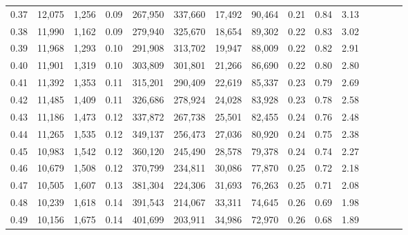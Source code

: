 \begin{tabular}{rrrcrrrrrrrrrrr}
0.37 &  12,075 &  1,256 &                                       0.09 &  267,950 &  337,660 &   17,492 &   90,464 &  0.21 &  0.84 &                         3.13 \\
0.38 &  11,990 &  1,162 &                                       0.09 &  279,940 &  325,670 &   18,654 &   89,302 &  0.22 &  0.83 &                         3.02 \\
0.39 &  11,968 &  1,293 &                                       0.10 &  291,908 &  313,702 &   19,947 &   88,009 &  0.22 &  0.82 &                         2.91 \\
0.40 &  11,901 &  1,319 &                                       0.10 &  303,809 &  301,801 &   21,266 &   86,690 &  0.22 &  0.80 &                         2.80 \\
0.41 &  11,392 &  1,353 &                                       0.11 &  315,201 &  290,409 &   22,619 &   85,337 &  0.23 &  0.79 &                         2.69 \\
0.42 &  11,485 &  1,409 &                                       0.11 &  326,686 &  278,924 &   24,028 &   83,928 &  0.23 &  0.78 &                         2.58 \\
0.43 &  11,186 &  1,473 &                                       0.12 &  337,872 &  267,738 &   25,501 &   82,455 &  0.24 &  0.76 &                         2.48 \\
0.44 &  11,265 &  1,535 &                                       0.12 &  349,137 &  256,473 &   27,036 &   80,920 &  0.24 &  0.75 &                         2.38 \\
0.45 &  10,983 &  1,542 &                                       0.12 &  360,120 &  245,490 &   28,578 &   79,378 &  0.24 &  0.74 &                         2.27 \\
0.46 &  10,679 &  1,508 &                                       0.12 &  370,799 &  234,811 &   30,086 &   77,870 &  0.25 &  0.72 &                         2.18 \\
0.47 &  10,505 &  1,607 &                                       0.13 &  381,304 &  224,306 &   31,693 &   76,263 &  0.25 &  0.71 &                         2.08 \\
0.48 &  10,239 &  1,618 &                                       0.14 &  391,543 &  214,067 &   33,311 &   74,645 &  0.26 &  0.69 &                         1.98 \\
0.49 &  10,156 &  1,675 &                                       0.14 &  401,699 &  203,911 &   34,986 &   72,970 &  0.26 &  0.68 &                         1.89 \\

\end{tabular}
